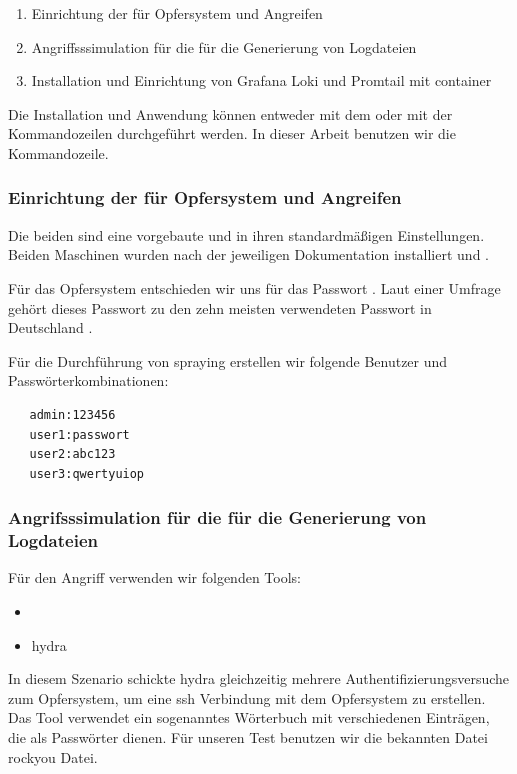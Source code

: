 \begin{enumerate}[noitemsep]
   \item	Einrichtung der  für Opfersystem und Angreifen
   \item	Angriffsssimulation für die für die Generierung von Logdateien
   \item Installation und Einrichtung von Grafana Loki und Promtail mit \gls{container}
\end{enumerate}

Die Installation und Anwendung können entweder mit dem  oder mit der Kommandozeilen durchgeführt werden. In dieser Arbeit benutzen wir die Kommandozeile. 

\newpage
\subsubsection{Einrichtung der  für Opfersystem und Angreifen}
Die beiden  sind eine vorgebaute  und  in ihren standardmäßigen Einstellungen. Beiden Maschinen wurden nach der jeweiligen Dokumentation installiert \citep{kali_vm} und \citep{Ubuntu_server}.

Für das Opfersystem entschieden wir uns für das Passwort . Laut einer Umfrage gehört dieses Passwort zu den zehn meisten verwendeten Passwort in Deutschland \citep{silicon_passwort}.  

Für die Durchführung von \gls{spraying} erstellen wir folgende Benutzer und Passwörterkombinationen:
{
\begin{verbatim}
   admin:123456
   user1:passwort
   user2:abc123
   user3:qwertyuiop
\end{verbatim}
}

\subsubsection{Angrifsssimulation für die für die Generierung von Logdateien}
Für den Angriff verwenden wir folgenden Tools:
\begin{itemize}[noitemsep]
   \item	{}
   \item \gls{hydra}
\end{itemize}

In diesem Szenario schickte \gls{hydra} gleichzeitig mehrere Authentifizierungsversuche zum Opfersystem, um eine \gls{ssh} Verbindung mit dem Opfersystem zu erstellen. Das Tool verwendet ein sogenanntes Wörterbuch mit verschiedenen Einträgen, die als Passwörter dienen. Für unseren Test benutzen wir die bekannten Datei \gls{rockyou} Datei. 

